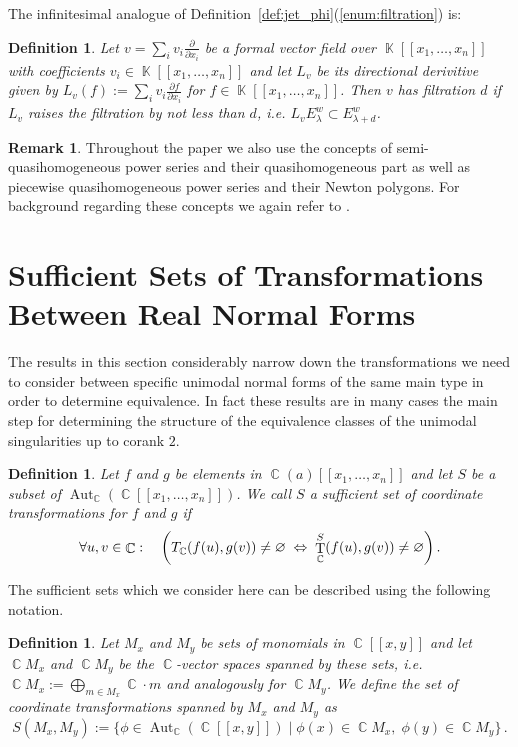 \documentclass[noend]{amsproc}
\newtheorem{defn}[theorem]{Definition}
\theoremstyle{definition}
\newtheorem{remark}[theorem]{Remark}
\let\originalleft\left
\let\originalright\right
\renewcommand{\left}{\mathopen{}\mathclose\bgroup\originalleft}
\renewcommand{\right}{\aftergroup\egroup\originalright}
\DeclareMathOperator{\C}{\mathbb{C}}
\DeclareMathOperator{\K}{\mathbb{K}}
\DeclareMathOperator{\T}{T}
\DeclareMathOperator{\Aut}{Aut}
\begin{document}
The infinitesimal analogue of
Definition~\ref{def:jet_phi}(\ref{enum:filtration}) is:

\begin{defn}
Let $v = \sum_i v_i \frac{\partial}{\partial x_i}$ be a formal vector field
over $\K[[x_1,\ldots,x_n]]$ with coefficients $v_i \in \K[[x_1,\ldots,x_n]]$
and let $L_v$ be its directional derivitive given by
$L_v(f) := \sum_i v_i \frac{\partial f}{\partial x_i}$ for
$f \in \K[[x_1,\ldots,x_n]]$. Then $v$ has filtration $d$ if $L_v$ raises the
filtration by not less than $d$, i.e.\@
$L_v E^w_\lambda \subset E^w_{\lambda+d}$.
\end{defn}

\begin{remark}
Throughout the paper we also use the concepts of semi-quasi\-homogeneous power
series and their quasihomogeneous part as well as piecewise quasihomogeneous
power series and their Newton polygons. For background regarding these concepts
we again refer to \citet{A1974}.
\end{remark}


\section{Sufficient Sets of Transformations Between Real Normal Forms}

The results in this section considerably narrow down the transformations we
need to consider between specific unimodal normal forms of the same main type
in order to determine equivalence. In fact these results are in many cases the
main step for determining the structure of the equivalence classes of the
unimodal singularities up to corank $2$.

\begin{defn}
Let $f$ and $g$ be elements in $\C(a)[[x_1,\ldots,x_n]]$ and let $S$ be a
subset of $\Aut_{\C}(\C[[x_1,\ldots,x_n]])$. We call $S$ a sufficient set of
coordinate transformations for $f$ and $g$ if
\[
\forall u,v \in \C: \quad
\left(T_{\C}(f(u),g(v)) \neq \varnothing
\;\Leftrightarrow\; \T_{\C}^S(f(u),g(v)) \neq \varnothing\right) \,.
\]
\end{defn}

The sufficient sets which we consider here can be described using the
following notation.

\begin{defn}
Let $M_x$ and $M_y$ be sets of monomials in $\C[[x,y]]$ and let $\C\! M_x$ and
$\C\! M_y$ be the $\C$-vector spaces spanned by these sets, i.e.\@
$\C\! M_x := \bigoplus_{m \in M_x} \C \cdot m$ and analogously for $\C\! M_y$. 
We define the set of coordinate transformations spanned by $M_x$ and $M_y$ as
\[
S(M_x, M_y) := \{ \phi \in \Aut_{\C}(\C[[x,y]]) \mid
\phi(x) \in \C\! M_x,\; \phi(y) \in \C\! M_y \} \,.
\]
\end{defn}
\end{document}

